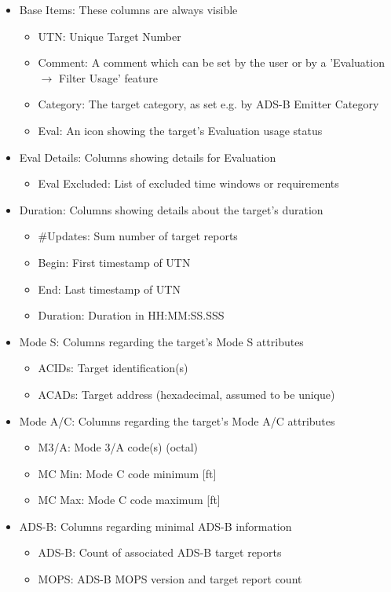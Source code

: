 \begin{itemize}  
\item Base Items: These columns are always visible
\begin{itemize}  
  \item UTN: Unique Target Number
  \item Comment: A comment which can be set by the user or by a 'Evaluation $\rightarrow$ Filter Usage' feature
  \item Category: The target category, as set e.g. by ADS-B Emitter Category
  \item Eval: An icon showing the target's Evaluation usage status
\end{itemize}
\item Eval Details: Columns showing details for Evaluation
\begin{itemize}  
  \item Eval Excluded: List of excluded time windows or requirements
\end{itemize}
\item Duration: Columns showing details about the target's duration
\begin{itemize}  
  \item \#Updates: Sum number of target reports 
  \item Begin: First timestamp of UTN
  \item End: Last timestamp of UTN
  \item Duration: Duration in HH:MM:SS.SSS
\end{itemize}
\item Mode S: Columns regarding the target's Mode S attributes
\begin{itemize}  
  \item ACIDs: Target identification(s)
  \item ACADs: Target address (hexadecimal, assumed to be unique)
\end{itemize}
\item Mode A/C: Columns regarding the target's Mode A/C attributes
\begin{itemize}  
  \item M3/A: Mode 3/A code(s) (octal)
  \item MC Min: Mode C code minimum [ft]
  \item MC Max: Mode C code maximum [ft]
\end{itemize}
\item ADS-B: Columns regarding minimal ADS-B information
\begin{itemize}  
  \item ADS-B: Count of associated ADS-B target reports
  \item MOPS: ADS-B MOPS version and target report count
\end{itemize}
\end{itemize}
\ \\

